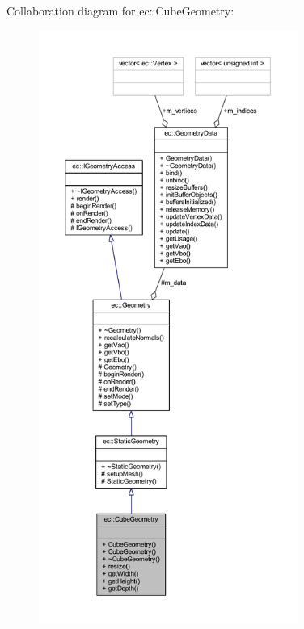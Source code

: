 Collaboration diagram for ec\+:\+:Cube\+Geometry\+:\nopagebreak
\begin{figure}[H]
\begin{center}
\leavevmode
\includegraphics[height=550pt]{classec_1_1_cube_geometry__coll__graph}
\end{center}
\end{figure}
